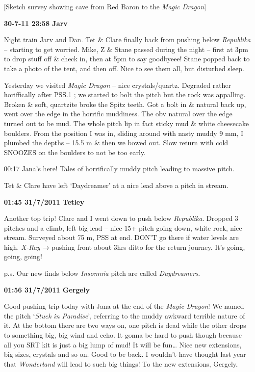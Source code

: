 {[}Sketch survey showing cave from Red Baron to the \emph{Magic
Dragon}{]}

\textbf{30-7-11 23:58 Jarv}

Night train Jarv and Dan. Tet \& Clare finally back from pushing below
\emph{Republika} -- starting to get worried. Mike, Z \& Stane passed
during the night -- first at 3pm to drop stuff off \& check in, then at
5pm to say goodbyeee! Stane popped back to take a photo of the tent, and
then off. Nice to see them all, but disturbed sleep.

Yesterday we visited \emph{Magic Dragon} -- nice crystals/quartz.
Degraded rather horiffically after PSS.1 ; we started to bolt the pitch
but the rock was appalling. Broken \& soft, quartzite broke the Spitz
teeth. Got a bolt in \& natural back up, went over the edge in the
horrific muddiness. The obv natural over the edge turned out to be mud.
The whole pitch lip in fact sticky mud \& white cheesecake boulders.
From the position I was in, sliding around with nasty muddy 9 mm, I
plumbed the depths -- 15.5 m \& then we bowed out. Slow return with cold
SNOOZES on the boulders to not be too early.

00:17 Jana's here! Tales of horrifically muddy pitch leading to massive
pitch.

Tet \& Clare have left `Daydreamer' at a nice lead above a pitch in
stream.

\textbf{01:45 31/7/2011 Tetley}

Another top trip! Clare and I went down to push below \emph{Republika}.
Dropped 3 pitches and a climb, left big lead -- nice 15+ pitch going
down, white rock, nice stream. Surveyed about 75 m, PSS at end. DON'T go
there if water levels are high. \emph{X-Ray} → pushing front about 3hrs
ditto for the return journey. It's going, going, going!

p.s. Our new finds below \emph{Insomnia} pitch are called
\emph{Daydreamers}.

\textbf{01:56 31/7/2011 Gergely}

Good pushing trip today with Jana at the end of the \emph{Magic Dragon}!
We named the pitch `\emph{Stuck in Paradise}', referring to the muddy
awkward terrible nature of it. At the bottom there are two ways on, one
pitch is dead while the other drops to something big, big wind and echo.
It gonna be hard to push though because all you SRT kit is just a big
lump of mud! It will be fun\ldots{} Nice new extensions, big sizes,
crystals and so on. Good to be back. I wouldn't have thought last year
that \emph{Wonderland} will lead to such big things! To the new
extensions, Gergely.

